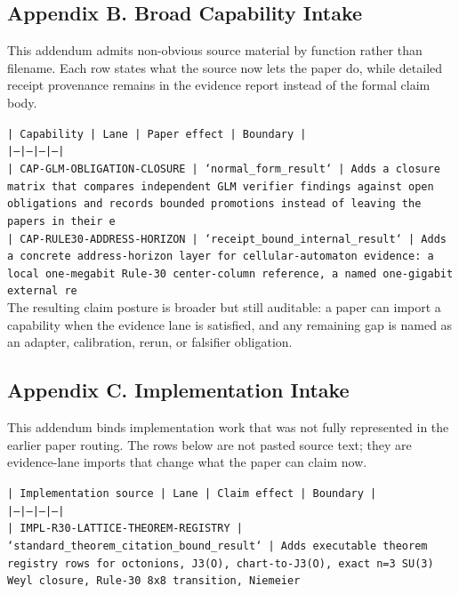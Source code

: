 \documentclass[11pt]{article}
\begin{document}
\subsection*{Appendix B. Broad Capability Intake}

This addendum admits non-obvious source material by function rather than filename. Each row states what the source now lets the paper do, while detailed receipt provenance remains in the evidence report instead of the formal claim body.

\noindent\texttt{| Capability | Lane | Paper effect | Boundary |}\\
\noindent\texttt{|---|---|---|---|}\\
\noindent\texttt{| CAP-GLM-OBLIGATION-CLOSURE | `normal\_form\_result` | Adds a closure matrix that compares independent GLM verifier findings against open obligations and records bounded promotions instead of leaving the papers in their e}\\
\noindent\texttt{| CAP-RULE30-ADDRESS-HORIZON | `receipt\_bound\_internal\_result` | Adds a concrete address-horizon layer for cellular-automaton evidence: a local one-megabit Rule-30 center-column reference, a named one-gigabit external re}\\

The resulting claim posture is broader but still auditable: a paper can import a capability when the evidence lane is satisfied, and any remaining gap is named as an adapter, calibration, rerun, or falsifier obligation.

\subsection*{Appendix C. Implementation Intake}

This addendum binds implementation work that was not fully represented in the earlier paper routing. The rows below are not pasted source text; they are evidence-lane imports that change what the paper can claim now.

\noindent\texttt{| Implementation source | Lane | Claim effect | Boundary |}\\
\noindent\texttt{|---|---|---|---|}\\
\noindent\texttt{| IMPL-R30-LATTICE-THEOREM-REGISTRY | `standard\_theorem\_citation\_bound\_result` | Adds executable theorem registry rows for octonions, J3(O), chart-to-J3(O), exact n=3 SU(3) Weyl closure, Rule-30 8x8 transition, Niemeier }\\
\end{document}
